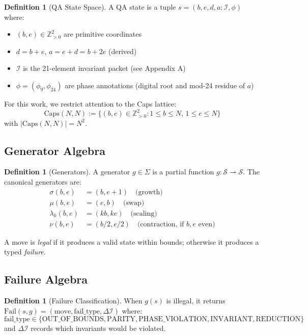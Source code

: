 \documentclass[11pt]{article}
\theoremstyle{definition}
\newtheorem{definition}[theorem]{Definition}
\begin{document}
\begin{definition}[QA State Space]
A QA state is a tuple $s = (b,e,d,a; \mathcal{I}, \phi)$ where:
\begin{itemize}
\item $(b,e) \in \mathbb{Z}_{>0}^2$ are primitive coordinates
\item $d = b+e$, $a = e+d = b+2e$ (derived)
\item $\mathcal{I}$ is the 21-element invariant packet (see Appendix A)
\item $\phi = (\phi_9, \phi_{24})$ are phase annotations (digital root and mod-24 residue of $a$)
\end{itemize}
\end{definition}

For this work, we restrict attention to the Caps lattice:
\[
\mathrm{Caps}(N,N) := \{(b,e) \in \mathbb{Z}_{>0}^2 : 1 \le b \le N, \, 1 \le e \le N\}
\]
with $|\mathrm{Caps}(N,N)| = N^2$.

\subsection{Generator Algebra}

\begin{definition}[Generators]
A generator $g \in \Sigma$ is a partial function $g: \mathcal{S} \rightharpoonup \mathcal{S}$. The canonical generators are:
\begin{align*}
\sigma(b,e) &= (b, e+1) \quad \text{(growth)} \\
\mu(b,e) &= (e, b) \quad \text{(swap)} \\
\lambda_k(b,e) &= (kb, ke) \quad \text{(scaling)} \\
\nu(b,e) &= (b/2, e/2) \quad \text{(contraction, if $b,e$ even)}
\end{align*}
\end{definition}

A move is \emph{legal} if it produces a valid state within bounds; otherwise it produces a typed \emph{failure}.

\subsection{Failure Algebra}

\begin{definition}[Failure Classification]
When $g(s)$ is illegal, it returns $\mathrm{Fail}(s, g) = (\text{move}, \text{fail\_type}, \Delta\mathcal{I})$ where:
\[
\text{fail\_type} \in \{\text{OUT\_OF\_BOUNDS}, \text{PARITY}, \text{PHASE\_VIOLATION}, \text{INVARIANT}, \text{REDUCTION}\}
\]
and $\Delta\mathcal{I}$ records which invariants would be violated.
\end{definition}
\end{document}
